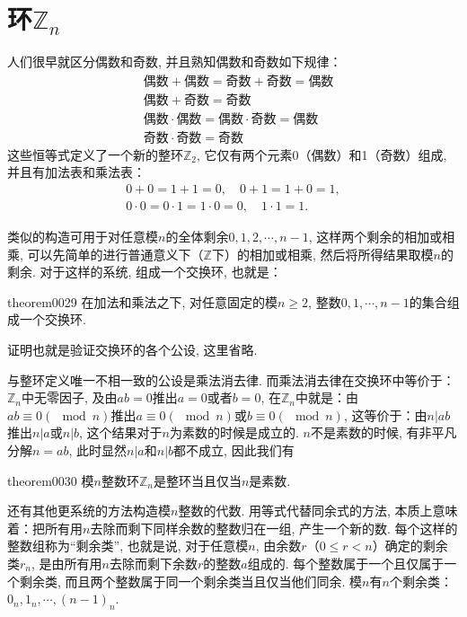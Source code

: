 \section{环$\mathbb{Z}_n$}\label{subsection0010110}
人们很早就区分偶数和奇数, 并且熟知偶数和奇数如下规律：
\[
\begin{aligned}
&\text{偶数}+\text{偶数} = \text{奇数} + \text{奇数} = \text{偶数}\\
&\text{偶数}+\text{奇数} = \text{奇数}\\
&\text{偶数}\cdot\text{偶数} = \text{偶数}\cdot\text{奇数} = \text{偶数}\\
&\text{奇数} \cdot \text{奇数} = \text{奇数}
\end{aligned}
\]
这些恒等式定义了一个新的整环$\mathbb{Z}_2$, 它仅有两个元素0（偶数）和1（奇数）组成, 并且有加法表和乘法表：
\begin{gather*}
0+0=1+1=0, \quad 0+1=1+0=1,\\
0 \cdot 0=0 \cdot 1= 1 \cdot 0 =0,\quad 1 \cdot 1 = 1.
\end{gather*}

类似的构造可用于对任意模$n$的全体剩余$0,1,2,\cdots,n-1$, 这样两个剩余的相加或相乘, 可以先简单的进行普通意义下（$\mathbb{Z}$下）的相加或相乘, 然后将所得结果取模$n$的剩余. 对于这样的系统, 组成一个交换环, 也就是：
\begin{theorem}{}{theorem0029}
在加法和乘法之下, 对任意固定的模$n \ge 2$, 整数$0, 1, \cdots, n-1$的集合组成一个交换环. 
\end{theorem}

证明也就是验证交换环的各个公设, 这里省略. 

与整环定义唯一不相一致的公设是乘法消去律. 而乘法消去律在交换环中等价于：$\mathbb{Z}_n$中无零因子, 及由$ab=0$推出$a=0$或者$b=0$, 在$\mathbb{Z}_n$中就是：由$ab \equiv 0(\mod{n})$推出$a \equiv 0(\mod{n})$或$b \equiv 0(\mod{n})$, 这等价于：由$n|ab$推出$n|a$或$n|b$, 这个结果对于$n$为素数的时候是成立的. $n$不是素数的时候, 有非平凡分解$n=ab$, 此时显然$n|a$和$n|b$都不成立, 因此我们有
\begin{theorem}{}{theorem0030}
模$n$整数环$\mathbb{Z}_n$是整环当且仅当$n$是素数. 
\end{theorem}

还有其他更系统的方法构造模$n$整数的代数. 用等式代替同余式的方法, 本质上意味着：把所有用$n$去除而剩下同样余数的整数归在一组, 产生一个新的数. 每个这样的整数组称为“剩余类”, 也就是说, 对于任意模$n$, 由余数$r$（$0 \le r < n$）确定的剩余类$r_n$, 是由所有用$n$去除而剩下余数$r$的整数$a$组成的. 每个整数属于一个且仅属于一个剩余类, 而且两个整数属于同一个剩余类当且仅当他们同余. 模$n$有$n$个剩余类：$0_n,1_n,\cdots,(n-1)_n$. 

